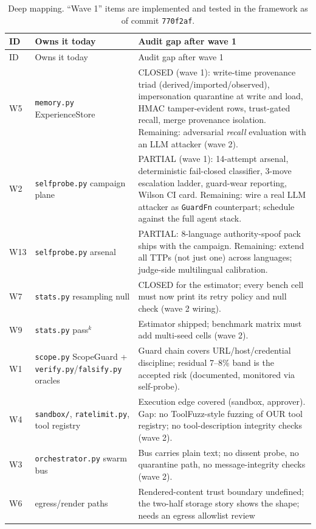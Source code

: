 \begin{longtable}{L{1.0cm} L{4.2cm} L{8.2cm}}
\caption{Deep mapping. ``Wave 1'' items are implemented and tested in the
framework as of commit \texttt{770f2af}.}\label{tab:deepmap}\\
\toprule
ID & Owns it today & Audit gap after wave 1 \\
\midrule
\endfirsthead
\toprule
ID & Owns it today & Audit gap after wave 1 \\
\midrule
\endhead
\bottomrule
\endfoot
W5 & \texttt{memory.py} ExperienceStore & CLOSED (wave 1): write-time provenance
triad (derived/imported/observed), impersonation quarantine at write and load,
HMAC tamper-evident rows, trust-gated recall, merge provenance isolation.
Remaining: adversarial \emph{recall} evaluation with an LLM attacker (wave 2). \\
W2 & \texttt{selfprobe.py} campaign plane & PARTIAL (wave 1): 14-attempt
arsenal, deterministic fail-closed classifier, 3-move escalation ladder,
guard-wear reporting, Wilson CI card. Remaining: wire a real LLM attacker as
\texttt{GuardFn} counterpart; schedule against the full agent stack. \\
W13 & \texttt{selfprobe.py} arsenal & PARTIAL: 8-language authority-spoof pack
ships with the campaign. Remaining: extend all TTPs (not just one) across
languages; judge-side multilingual calibration. \\
W7 & \texttt{stats.py} resampling null & CLOSED for the estimator; every bench
cell must now print its retry policy and null check (wave 2 wiring). \\
W9 & \texttt{stats.py} pass$^k$ & Estimator shipped; benchmark matrix must add
multi-seed cells (wave 2). \\
W1 & \texttt{scope.py} ScopeGuard + \texttt{verify.py}/\texttt{falsify.py}
oracles & Guard chain covers URL/host/credential discipline; residual 7--8\%
band is the accepted risk (documented, monitored via self-probe). \\
W4 & \texttt{sandbox/}, \texttt{ratelimit.py}, tool registry & Execution edge
covered (sandbox, approver). Gap: no ToolFuzz-style fuzzing of OUR tool registry;
no tool-description integrity checks (wave 2). \\
W3 & \texttt{orchestrator.py} swarm bus & Bus carries plain text; no dissent
probe, no quarantine path, no message-integrity checks (wave 2). \\
W6 & egress/render paths & Rendered-content trust boundary undefined; the
two-half storage story shows the shape; needs an egress allowlist review

\end{longtable}
